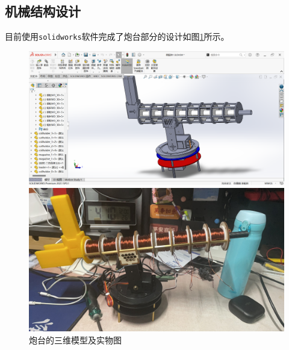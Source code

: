 \documentclass{article}
\begin{document}
\subsection{机械结构设计}
    目前使用\texttt{solidworks}软件完成了炮台部分的设计如图\ref{3dmodel}所示。
\begin{figure}
    \centering
    \begin{minipage}[b]{.45\linewidth}
        \includegraphics[width=\linewidth]{imgs/3d.png}
    \end{minipage}
    \begin{minipage}[b]{.45\linewidth}
        \includegraphics[width=\linewidth]{imgs/act.jpg}
    \end{minipage}
    \caption{炮台的三维模型及实物图}
    \label{3dmodel}
\end{figure}
\end{document}
